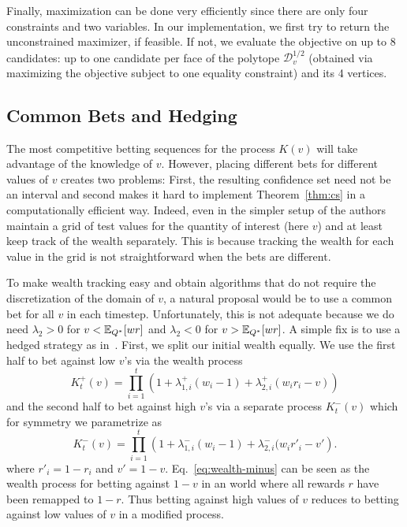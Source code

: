 Finally, maximization can be done very efficiently since there are 
only four constraints and two variables. In our implementation, we
first try to return the unconstrained maximizer, if feasible. 
If not, we evaluate the objective on up to 8 candidates: 
up to one candidate per face of the polytope $\mathcal{D}_v^{1/2}$ 
(obtained via maximizing the objective subject to one equality constraint) 
and its 4 vertices.

\subsection{Common Bets and Hedging}
The most competitive betting sequences for the process
$K(v)$ will take advantage 
of the knowledge of $v$. However, placing different
bets for different values of $v$ creates two problems:
First, the resulting confidence set need not be an 
interval and second makes it hard 
to implement Theorem~\ref{thm:cs} 
in a computationally efficient way.
Indeed, even in the simpler setup of
\cite{waudby-smith_variance-adaptive_2020}
the authors maintain a grid of test values 
for the quantity of interest (here $v$)  
and at least keep track of the wealth separately.
This is because tracking the wealth for each
value in the grid is not straightforward when
the bets are different. 

To make wealth tracking easy and
obtain algorithms that do not require the 
discretization of the domain of $v$, a natural
proposal would be to use a common bet for 
all $v$ in each timestep. Unfortunately, 
this is not adequate because we do need 
$\lambda_2 > 0$ for $v<\mathbb{E}_{Q^*}[wr]$ 
and $\lambda_2 < 0$ for $v>\mathbb{E}_{Q^*}[wr]$. 
A simple fix is to use a hedged 
strategy as in~\cite{waudby-smith_variance-adaptive_2020}.
First, we split our initial wealth equally.
We use the first half to bet against low $v$'s
via the wealth process
\[
K_t^{+}(v) = \prod_{i=1}^t \left(1+\lambda_{1,i}^{+}(w_i-1)+\lambda_{2,i}^{+}(w_i r_i -v)\right)
\]
and the second half to bet against high $v$'s
via a separate process $K_t^{-}(v)$ which 
for symmetry we parametrize as
\begin{equation}
K_t^{-}(v) = \prod_{i=1}^t \left(1+\lambda_{1,i}^{-}(w_i-1)+\lambda_{2,i}^{-}(w_i r'_i -v'\right).
\label{eq:wealth-minus} 
\end{equation}
where $r'_i=1-r_i$ and $v'=1-v$.
Eq.~\eqref{eq:wealth-minus} 
can be seen as the wealth process for betting against $1-v$ 
in an world where all rewards $r$ have been remapped 
to $1-r$. Thus betting against high values of $v$ 
reduces to betting against low values of $v$ in a
modified process. 


